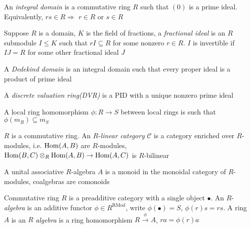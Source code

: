 \documentclass[main]{subfiles}
\begin{document}
\begin{definition}
An \textit{integral domain} is a commutative ring $R$ such that $(0)$ is a prime ideal. Equivalently, $rs\in R\Rightarrow$ $r\in R$ or $s\in R$
\end{definition}

\begin{definition}
Suppose $R$ is a domain, $K$ is the field of fractions, a \textit{fractional ideal} is an $R$ submodule $I\leq K$ such that $rI\subseteq R$ for some nonzero $r\in R$. $I$ is invertible if $IJ=R$ for some other fractional ideal $J$
\end{definition}

\begin{definition}
A \textit{Dedekind domain} is an integral domain such that every proper ideal is a product of prime ideal
\end{definition}

\begin{definition}
A \textit{discrete valuation ring(DVR)} is a PID with a unique nonzero prime ideal
\end{definition}

\begin{definition}
A local ring homomorphism $\phi:R\to S$ between local rings is such that $\phi(m_R)\subseteq m_S$
\end{definition}

\begin{definition}
$R$ is a commutative ring. An $R$-\textit{linear category} $\mathscr C$ is a category enriched over $R$-modules, i.e. $\operatorname{Hom}(A,B)$ are $R$-modules, $\operatorname{Hom}(B,C)\otimes_R\operatorname{Hom}(A,B)\to\operatorname{Hom}(A,C)$ is $R$-bilinear
\end{definition}

\begin{definition}
A unital associative $R$-algebra $A$ is a monoid in the monoidal category of $R$-modules, coalgebras are comonoids
\end{definition}

\begin{definition}
Commutative ring $R$ is a preadditive category with a single object $\bullet$. An $R$-\textit{algebra} is an additive functor $\phi\in R^\mathrm{RMod}$, write $\phi(\bullet)=S$, $\phi(r)s=rs$. A ring $A$ is an $R$ \textit{algebra} is a ring homomorphism $R\xrightarrow{\phi}A$, $ra=\phi(r)a$
\end{definition}
\end{document}
